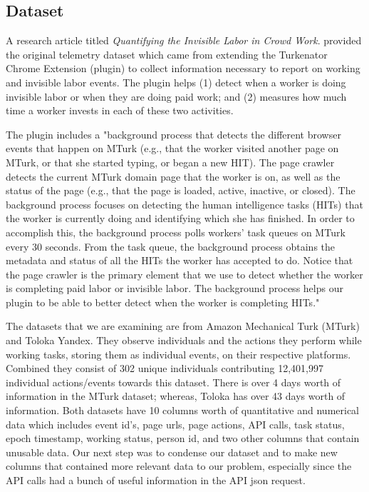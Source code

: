 \documentclass[11pt]{article}
\begin{document}
\begin{multicols}{2}
\subsection{Dataset}
A research article titled \textit{Quantifying the Invisible Labor in Crowd Work}. \cite{toxtli2021} provided the original telemetry dataset which came from extending the Turkenator Chrome Extension (plugin) to collect information necessary to report on working and  invisible labor events. \cite{toloka-web-extension-github} The plugin helps (1) detect when a worker is doing invisible labor or when they are doing paid work; and (2) measures how much time a worker invests in each of these two activities. \cite[p.~4]{toxtli2021}

The plugin includes a "background process that detects the different browser events that happen on MTurk (e.g., that the worker visited another page on MTurk, or that she started typing, or began a new HIT). The page crawler detects the current MTurk domain page that the worker is on, as well as the status of the page (e.g., that the page is loaded, active, inactive, or closed). The background process focuses on detecting the human intelligence tasks (HITs) that the worker is currently doing and identifying which she has finished. In order to accomplish this, the background process polls workers’ task queues on MTurk every 30 seconds. From the task queue, the background process obtains the metadata and status of all the HITs the worker has accepted to do. Notice that the page crawler is the primary element that we use to detect whether the worker is completing paid labor or invisible labor. The background process helps our plugin to be able to better detect when the worker is completing HITs." \cite[p.~5]{toxtli2021}

The datasets that we are examining are from Amazon Mechanical Turk (MTurk) and Toloka Yandex. They observe individuals and the actions they perform while working tasks, storing them as individual events, on their respective platforms. Combined they consist of 302 unique individuals contributing 12,401,997 individual actions/events towards this dataset. There is over 4 days worth of information in the MTurk dataset; whereas, Toloka has over 43 days worth of information. Both datasets have 10 columns worth of quantitative and numerical data which includes event id’s, page urls, page actions, API calls, task status, epoch timestamp, working status, person id, and two other columns that contain unusable data. Our next step was to condense our dataset and to make new columns that contained more relevant data to our problem, especially since the API calls had a bunch of useful information in the API json request. 

\end{multicols}
\end{document}
